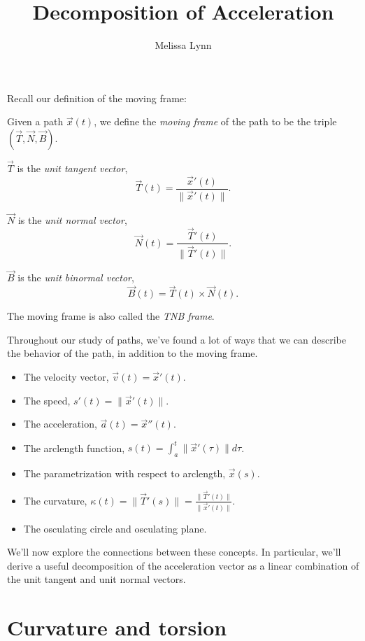 \documentclass{ximera}
\title{Decomposition of Acceleration}
\author{Melissa Lynn}
\begin{document}
\begin{abstract}
\end{abstract}
\maketitle

Recall our definition of the moving frame:

\begin{definition}
Given a path $\vec{x}(t)$, we define the \emph{moving frame} of the path to be the triple $(\vec{T},\vec{N},\vec{B})$.

$\vec{T}$ is the \emph{unit tangent vector},
\[
\vec{T}(t) = \dfrac{\vec{x}'(t)}{\|\vec{x}'(t)\|}.
\]

$\vec{N}$ is the \emph{unit normal vector},
\[
\vec{N}(t) = \dfrac{\vec{T}'(t)}{\|\vec{T}'(t)\|}.
\]

$\vec{B}$ is the \emph{unit binormal vector},
\[
\vec{B}(t) = \vec{T}(t)\times\vec{N}(t).
\] 

The moving frame is also called the \emph{TNB frame}.
\end{definition}

Throughout our study of paths, we've found a lot of ways that we can describe the behavior of the path, in addition to the moving frame.
\begin{itemize}
\item The velocity vector, $\vec{v}(t)= \vec{x}'(t)$.
\item The speed, $s'(t) = \|\vec{x}'(t)\|$.
\item The acceleration, $\vec{a}(t) = \vec{x}''(t)$.
\item The arclength function, $s(t) = \int_a^t \|\vec{x}'(\tau)\|d\tau$.
\item The parametrization with respect to arclength, $\vec{x}(s)$.
\item The curvature, $\kappa(t) = \|\vec{T}'(s)\| = \frac{\|\vec{T}'(t)\|}{\|\vec{x}'(t)\|}$.
\item The osculating circle and osculating plane.
\end{itemize}

We'll now explore the connections between these concepts. In particular, we'll derive a useful decomposition of the acceleration vector as a linear combination of the unit tangent and unit normal vectors.

\section*{Curvature and torsion}
\end{document}
